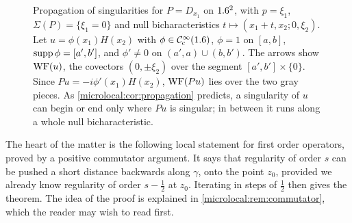 \begin{figure}[htbp]
\centering
{}
\caption[A null bicharacteristic carrying a singularity]{Propagation of
singularities for $P=D_{x_1}$ on $1.6^2$, with $p=\xi_1$, $\Sigma(P)=\{\xi_1=0\}$
and null bicharacteristics $t\mapsto(x_1+t,x_2;0,\xi_2)$. Let
$u=\phi(x_1)H(x_2)$ with $\phi\in\mathcal{C}^\infty_{\mathrm{c}}(1.6)$, $\phi=1$ on $[a,b]$,
$\operatorname{supp}\phi=[a',b']$, and $\phi'\neq0$ on $(a',a)\cup(b,b')$. The arrows show
$\operatorname{WF}(u)$, the covectors $(0,\pm\xi_2)$ over the segment $[a',b']\times\{0\}$.
Since $Pu=-i\phi'(x_1)H(x_2)$, $\operatorname{WF}(Pu)$ lies over the two gray pieces. As
\cref{microlocal:cor:propagation} predicts, a singularity of $u$ can begin or
end only where $Pu$ is singular; in between it runs along a whole null
bicharacteristic.}
\label{microlocal:fig:propagation}
\end{figure}

The heart of the matter is the following local statement for first order
operators, proved by a positive commutator argument. It says that regularity
of order $s$ can be pushed a short distance backwards along $\gamma$, onto
the point $z_0$, provided we already know regularity of order $s-\frac12$ at
$z_0$. Iterating in steps of $\frac12$ then gives the theorem. The idea of the
proof is explained in \cref{microlocal:rem:commutator}, which the reader may
wish to read first.

